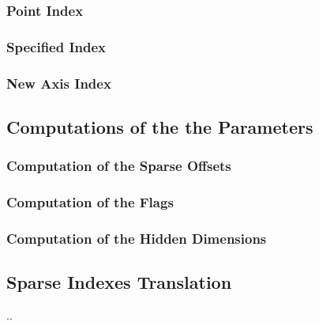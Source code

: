 \subsubsection{Point Index}
\subsubsection{Specified Index}
\subsubsection{New Axis Index}

\subsection{Computations of the the Parameters}
\subsubsection{Computation of the Sparse Offsets}
\subsubsection{Computation of the Flags}
\subsubsection{Computation of the Hidden Dimensions}

\subsection{Sparse Indexes Translation}
..